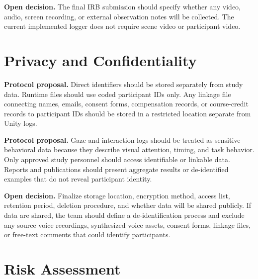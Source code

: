 \documentclass[11pt,letterpaper]{article}
\newcommand{\status}[1]{\textbf{#1.}}
\begin{document}
\status{Open decision} The final IRB submission should specify whether any video, audio, screen recording, or external observation notes will be collected. The current implemented logger does not require scene video or participant video.

\section{Privacy and Confidentiality}

\status{Protocol proposal} Direct identifiers should be stored separately from study data. Runtime files should use coded participant IDs only. Any linkage file connecting names, emails, consent forms, compensation records, or course-credit records to participant IDs should be stored in a restricted location separate from Unity logs.

\status{Protocol proposal} Gaze and interaction logs should be treated as sensitive behavioral data because they describe visual attention, timing, and task behavior. Only approved study personnel should access identifiable or linkable data. Reports and publications should present aggregate results or de-identified examples that do not reveal participant identity.

\status{Open decision} Finalize storage location, encryption method, access list, retention period, deletion procedure, and whether data will be shared publicly. If data are shared, the team should define a de-identification process and exclude any source voice recordings, synthesized voice assets, consent forms, linkage files, or free-text comments that could identify participants.

\section{Risk Assessment}
\end{document}
